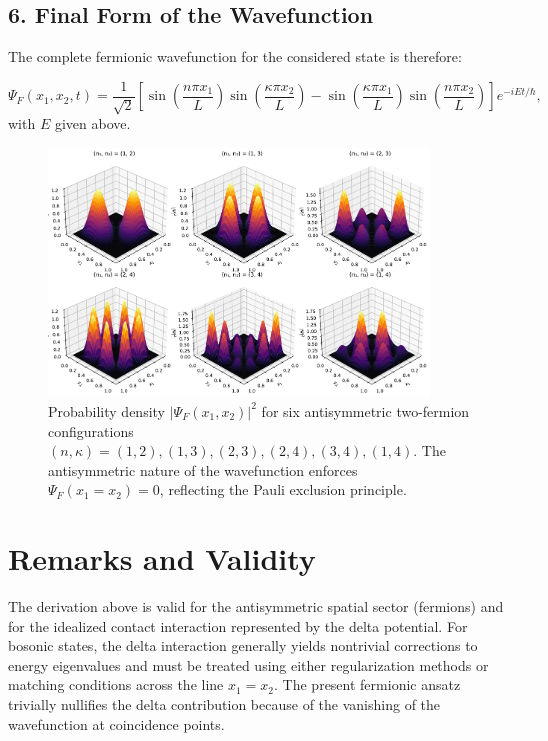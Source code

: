 \subsection*{6. Final Form of the Wavefunction}

The complete fermionic wavefunction for the considered state is therefore:


\begin{equation}
	\Psi_F(x_1, x_2, t) = \frac{1}{\sqrt{2}}
	\left[
		\sin\left(\frac{n\pi x_1}{L}\right)\sin\left(\frac{\kappa\pi x_2}{L}\right)
		- \sin\left(\frac{\kappa\pi x_1}{L}\right)\sin\left(\frac{n\pi x_2}{L}\right)
	\right]
	e^{-iEt/\hbar},
\end{equation}
with $E$ given above.

\begin{figure}[h!]
	\centering
	\includegraphics[width=0.9\textwidth]{ figures/fermions_3D_collage-1.pdf}
	\caption{Probability density $|\Psi_F(x_1, x_2)|^2$ for six antisymmetric two-fermion configurations
		$(n,\kappa) = (1,2), (1,3), (2,3), (2,4), (3,4), (1,4)$.
	The antisymmetric nature of the wavefunction enforces $\Psi_F(x_1 = x_2) = 0$, reflecting the Pauli exclusion principle.}
	\label{fig:fermion_3D_collage}
\end{figure}


\section{Remarks and Validity}

The derivation above is valid for the antisymmetric spatial sector (fermions) and for the idealized contact interaction represented by the delta potential. For bosonic states, the delta interaction generally yields nontrivial corrections to energy eigenvalues and must be treated using either regularization methods or matching conditions across the line $x_1=x_2$. The present fermionic ansatz trivially nullifies the delta contribution because of the vanishing of the wavefunction at coincidence points.

